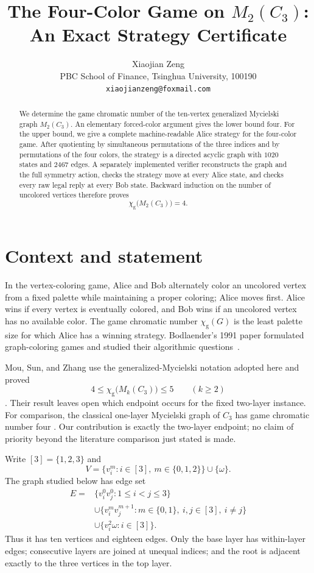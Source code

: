 \documentclass[11pt]{article}
\title{The Four-Color Game on $M_2(C_3)$:\\An Exact Strategy Certificate}
\author{Xiaojian Zeng\\
PBC School of Finance, Tsinghua University, 100190\\
\texttt{xiaojianzeng@foxmail.com}}
\date{}
\newcommand{\gamechi}{\chi_{\mathrm g}}
\begin{document}
\maketitle

\begin{abstract}
We determine the game chromatic number of the ten-vertex generalized
Mycielski graph $M_2(C_3)$.  An elementary forced-color argument gives the
lower bound four.  For the upper bound, we give a complete machine-readable
Alice strategy for the four-color game.  After quotienting by simultaneous
permutations of the three indices and by permutations of the four colors, the
strategy is a directed acyclic graph with $1020$ states and $2467$ edges.  A
separately implemented verifier reconstructs the graph and the full symmetry
action, checks the strategy move at every Alice state, and checks every raw
legal reply at every Bob state.  Backward induction on the number of uncolored
vertices therefore proves
\[
  \gamechi\bigl(M_2(C_3)\bigr)=4.
\]
\end{abstract}

\section{Context and statement}

In the vertex-coloring game, Alice and Bob alternately color an uncolored
vertex from a fixed palette while maintaining a proper coloring; Alice moves
first.  Alice wins if every vertex is eventually colored, and Bob wins if an
uncolored vertex has no available color.  The game chromatic number
$\gamechi(G)$ is the least palette size for which Alice has a winning
strategy.  Bodlaender's 1991 paper formulated graph-coloring games and
studied their algorithmic questions~\cite{Bodlaender1991}.

Mou, Sun, and Zhang use the generalized-Mycielski notation adopted here and
proved
\[
  4\leq \gamechi\bigl(M_k(C_3)\bigr)\leq 5
  \qquad (k\geq 2)
\]
\cite[Theorem~5.1(1)]{MouSunZhang2026}.  Their result leaves open which
endpoint occurs for the fixed two-layer instance.  For comparison, the
classical one-layer Mycielski graph of $C_3$ has game chromatic number four
\cite[p.~262]{AlagammaiVijayalakshmi2019}.  Our contribution is exactly the
two-layer endpoint; no claim of priority beyond the literature comparison
just stated is made.

Write $[3]=\{1,2,3\}$ and
\[
 V=\{v_i^m:i\in[3],\ m\in\{0,1,2\}\}\cup\{\omega\}.
\]
The graph studied below has edge set
\begin{align*}
E={}&\{v_i^0v_j^0:1\leq i<j\leq3\}\\
 &\cup\{v_i^m v_j^{m+1}:m\in\{0,1\},\ i,j\in[3],\ i\neq j\}\\
 &\cup\{v_i^2\omega:i\in[3]\}.
\end{align*}
Thus it has ten vertices and eighteen edges.  Only the base layer has
within-layer edges; consecutive layers are joined at unequal indices; and the
root is adjacent exactly to the three vertices in the top layer.
\end{document}
